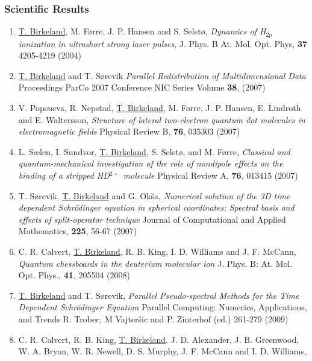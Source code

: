 \documentclass{beamer}
\begin{document}
\begin{frame}
	\frametitle{Scientific Results}
	\tiny

	\vspace{0.25cm}
	\begin{enumerate}
		\item
			{\color<2->{gray}
			\underline{T. Birkeland}, M. Førre, J. P. Hansen and S. Selstø, \textit{Dynamics of H$_{2p}$ ionization in ultrashort strong laser pulses}, J. Phys. B At. Mol. Opt. Phys, \textbf{37} 4205-4219 (2004)
			}
		\item 
			{\color<2->{uibgreen}
			\underline{T. Birkeland} and T. Sørevik
			\textit{Parallel Redistribution of Multidimensional Data}
			Proceedings ParCo 2007 Conference
			NIC Series Volume \textbf{38}, (2007)
			}
		\item
			{\color<2->{uibgreen}
			V. Popsueva, R. Nepstad, \underline{T. Birkeland}, M. Førre, J. P. Hansen, E. Lindroth and E. Waltersson,
			\textit{Structure of lateral two-electron quantum dot molecules in electromagnetic fields}
			{Physical Review} B, \textbf{76}, 035303 (2007)
			}
		\item
			{\color<2->{uibgreen}
			L. Sælen, I. Sundvor, \underline{T. Birkeland}, S. Selstø, and M. Førre, 
			\textit{Classical and quantum-mechanical investigation of the role of nondipole effects on the binding of a stripped HD$^{2+}$ molecule}
			{Physical Review} A, \textbf{76}, 013415 (2007)
			}
		\item
			{\color<2->{uibgreen}
			T. Sørevik, \underline{T. Birkeland} and G. Okša, 
			\textit{Numerical solution of the 3D time dependent Schrödinger equation in
		spherical coordinates: Spectral basis and effects of split-operator
		technique}
			{Journal of Computational and Applied Mathematics}, \textbf{225}, 56-67 (2007) 
			}
		\item
			{\color<2->{uibgreen}
			C. R. Calvert, \underline{T. Birkeland}, R. B. King, I. D. Williams and J. F. McCann, 
			\textit{Quantum chessboards in the deuterium molecular ion}
			{J. Phys. B: At. Mol. Opt. Phys.}, \textbf{41}, 205504 (2008)
			}
		\item
			{\color<3->{uibred} 
			\underline{T. Birkeland} and T. Sørevik, 
			\textit{Parallel Pseudo-spectral Methods for the Time Dependent Schrödinger Equation}
			{Parallel Computing: Numerics, Applications, and Trends}
			R. Trobec, M Vajteršic and P. Zinterhof (ed.) 261-279 (2009) 
			}
		\item
			{\color<2->{gray}
			C. R. Calvert, R. B. King, \underline{T. Birkeland}. J. D.  Alexander, J. B. Greenwood, W. A. Bryan, W. R. Newell, D. S. Murphy, J. F. McCann and I. D. Williams, 
}
\end{enumerate}
\end{frame}
\end{document}
